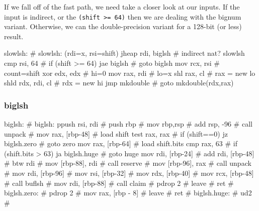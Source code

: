 If we fall off of the fast path, we need take a closer look at our inputs.
If the input is indirect, or the \lstinline|(shift >= 64)| then we are
dealing with the bignum variant.  Otherwise, we can the double-precision
variant for a 128-bit (or less) result.

\begin{asm}
slowlsh:                                    # slowlsh: (rdi=x, rsi=shift)
	jheap	rdi, biglsh                 #   indirect nat? slowlsh
	cmp	rsi, 64                     #   if (shift >= 64)
	jae	biglsh                      #     goto biglsh
	mov	rcx, rsi                    #   count=shift
	xor	edx, edx                    #   hi=0
	mov	rax, rdi                    #   lo=x
	shl	rax, cl                     #   rax = new lo
	shld	rdx, rdi, cl                #   rdx = new hi
	jmp	mkdouble                    #   goto mkdouble(rdx,rax)
\end{asm}

\subsubsection{biglsh}

\begin{asm}
biglsh:                                     # biglsh:
	ppush	rsi, rdi                    #
	push	rbp                         #
	mov	rbp,rsp                     #
	add	rsp, -96                    #
	call	unpack                      #
	mov	rax, [rbp-48]               #   load shift
	test	rax, rax                    #   if (shift==0)
	jz	biglsh.zero                 #     goto zero
	mov	rax, [rbp-64]               #   load shift.bits
	cmp	rax, 63                     #   if (shift.bits > 63)
	ja	biglsh.huge                 #     goto huge
	mov	rdi, [rbp-24]               #
	add	rdi, [rbp-48]               #
	btw	rdi                         #
	mov	[rbp-88], rdi               #
	call	reserve                     #
	mov	[rbp-96], rax               #
	call	unpack                      #
	mov	rdi, [rbp-96]               #
	mov	rsi, [rbp-32]               #
	mov	rdx, [rbp-40]               #
	mov	rcx, [rbp-48]               #
	call	buflsh                      #
	mov	rdi, [rbp-88]               #
	call	claim                       #
	pdrop	2                           #
	leave                               #
	ret                                 #
biglsh.zero:                                #
	pdrop	2                           #
	mov	rax, [rbp - 8]              #
	leave                               #
	ret                                 #
biglsh.huge:                                #
	ud2                                 #
\end{asm}

